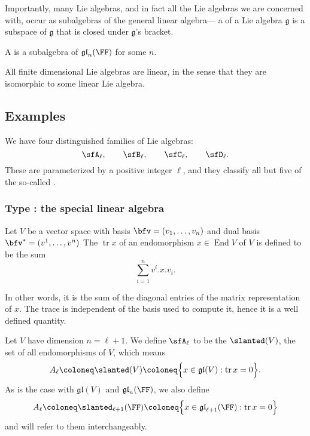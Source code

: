 \documentclass{article}
\DeclareMathOperator{\End}{End}
\DeclareMathOperator{\tr}{tr}
\newcommand*\frkg{{\ensuremath{\mathfrak{g}}}}
\newcommand*\gl{\ensuremath{\mathfrak{gl}}}
\let\sl\slanted
\newcommand*\sl{\ensuremath{\mathfrak{sl}}}
\newcommand*\acts{.}
\begin{document}
Importantly, many Lie algebras, and in fact all the Lie algebras we are concerned with, occur as subalgebras of the general linear algebra--- a  of a Lie algebra $\frkg$ is a subspace of $\frkg$ that is closed under $\frkg$'s bracket.

\begin{definition}
    A  is a subalgebra of $\gl_n(\FF)$ for some $n$.
\end{definition}

All finite dimensional Lie algebras are linear, in the sense that they are isomorphic to some linear Lie algebra.

\subsection{Examples}

We have four distinguished families of Lie algebras:
\[
    \sfA_\ell,\qquad
    \sfB_\ell,\qquad
    \sfC_\ell,\qquad
    \sfD_\ell.
\]
These are parameterized by a positive integer $\ell$, and they classify all but five of the so-called .

\subsubsection{Type \sfA: the special linear algebra}

\begin{definition}
    Let $V$ be a vector space with basis $\bfv = (v_1, \ldots, v_n)$ and dual basis $\bfv^\ast = (v^1, \ldots, v^n)$
    The  $\tr x$ of an endomorphism $x \in \End V$ of $V$ is defined to be the sum
    \[
        \sum_{i=1}^n 
        v^i \acts x \acts v_i.
    \]
\end{definition}

In other words, it is the sum of the diagonal entries of the matrix representation of $x$.
The trace is independent of the basis used to compute it, hence it is a well defined quantity.

\begin{definition}
    Let $V$ have dimension $n = \ell + 1$.
    We define $\sfA_\ell$ to be the  $\sl(V)$, the set of all  endomorphisms of $V$, which means
    \[
        A_\ell
        \coloneq
        \sl(V)
        \coloneq
        \Big\{
            x \in \gl(V) : \tr x = 0
        \Big\}.
    \]
    As is the case with $\gl(V)$ and $\gl_n(\FF)$, we also define 
    \[
        A_\ell
        \coloneq
        \sl_{\ell+1}(\FF)
        \coloneq
        \Big\{
            x \in \gl_{\ell+1}(\FF) : \tr x = 0
        \Big\}
    \]
    and will refer to them interchangeably.
\end{definition}
\end{document}
